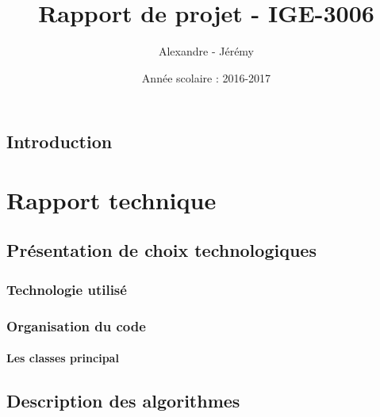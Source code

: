 \documentclass{report}
\title{Rapport de projet - IGE-3006}
\author{Alexandre \bsc{Causse} - Jérémy \bsc{Fornarino}}
\date{Année scolaire : 2016-2017}
\begin{document}
\maketitle

\renewcommand{\contentsname}{Sommaire} 
\tableofcontents
\listoffigures

\chapter*{Introduction}


\part{Rapport technique}
	\chapter{Présentation de choix technologiques}
		\section{Technologie utilisé}
		\section{Organisation du code}
			\subsection{Les classes principal}
	\chapter{Description des algorithmes}
\end{document}
